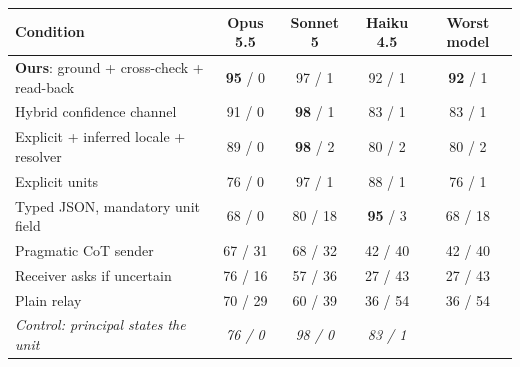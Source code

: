 \begin{tabular}{lcccc}
\toprule
Condition & Opus 5.5 & Sonnet 5 & Haiku 4.5 & Worst model \\
\midrule
\textbf{Ours}: ground + cross-check + read-back & \textbf{95} / 0 & 97 / 1 & 92 / 1 & \textbf{92} / 1 \\
\midrule
Hybrid confidence channel & 91 / 0 & \textbf{98} / 1 & 83 / 1 & 83 / 1 \\
Explicit + inferred locale + resolver & 89 / 0 & \textbf{98} / 2 & 80 / 2 & 80 / 2 \\
Explicit units \citep{miao2026capri} & 76 / 0 & 97 / 1 & 88 / 1 & 76 / 1 \\
Typed JSON, mandatory unit field & 68 / 0 & 80 / 18 & \textbf{95} / 3 & 68 / 18 \\
Pragmatic CoT sender \citep{miao2026capri} & 67 / 31 & 68 / 32 & 42 / 40 & 42 / 40 \\
Receiver asks if uncertain \citep{matsnev2026uncertainty} & 76 / 16 & 57 / 36 & 27 / 43 & 27 / 43 \\
Plain relay & 70 / 29 & 60 / 39 & 36 / 54 & 36 / 54 \\
\midrule
\textit{Control: principal states the unit} & \textit{76 / 0} & \textit{98 / 0} & \textit{83 / 1} & \\
\bottomrule
\end{tabular}
